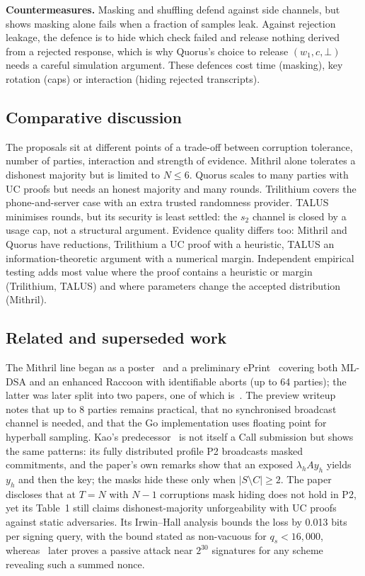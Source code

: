 \documentclass[10pt,conference,a4paper]{IEEEtran}
\begin{document}
\textbf{Countermeasures.} Masking and shuffling defend against side channels, but~\cite{concealed} shows masking alone
fails when a fraction of samples leak. Against rejection leakage, the defence is to hide which check failed and release
nothing derived from a rejected response, which is why Quorus's choice to release $(w_1,c,\bot)$ needs a careful
simulation argument. These defences cost time (masking), key rotation (caps) or interaction (hiding rejected
transcripts).

\subsection{Comparative discussion}
The proposals sit at different points of a trade-off between corruption tolerance, number of parties, interaction and
strength of evidence. Mithril alone tolerates a dishonest majority but is limited to $N\le6$. Quorus scales to many
parties with UC proofs but needs an honest majority and many rounds. Trilithium covers the phone-and-server case with an
extra trusted randomness provider. TALUS minimises rounds, but its security is least settled: the $s_2$ channel is closed
by a usage cap, not a structural argument. Evidence quality differs too: Mithril and Quorus have reductions, Trilithium a
UC proof with a heuristic, TALUS an information-theoretic argument with a numerical margin. Independent empirical testing
adds most value where the proof contains a heuristic or margin (Trilithium, TALUS) and where parameters change the
accepted distribution (Mithril).

\subsection{Related and superseded work}
The Mithril line began as a poster~\cite{mithrilposter} and a preliminary ePrint~\cite{reloaded} covering both ML-DSA and
an enhanced Raccoon with identifiable aborts (up to 64 parties); the latter was later split into two papers, one of which
is~\cite{mithril}. The preview writeup~\cite{mithrilpw} notes that up to 8 parties remains practical, that no
synchronised broadcast channel is needed, and that the Go implementation uses floating point for hyperball sampling.
Kao's predecessor~\cite{kao} is not itself a Call submission but shows the same patterns: its fully distributed profile
P2 broadcasts masked commitments, and the paper's own remarks show that an exposed $\lambda_h A y_h$ yields $y_h$ and then
the key; the masks hide these only when $|S\setminus C|\ge2$. The paper discloses that at $T=N$ with $N-1$ corruptions
mask hiding does not hold in P2, yet its Table~1 still claims dishonest-majority unforgeability with UC proofs against
static adversaries. Its Irwin--Hall analysis bounds the loss by 0.013 bits per signing query, with the bound stated as
non-vacuous for $q_s<16{,}000$, whereas~\cite{talus} later proves a passive attack near $2^{30}$ signatures for any scheme
revealing such a summed nonce.
\end{document}
